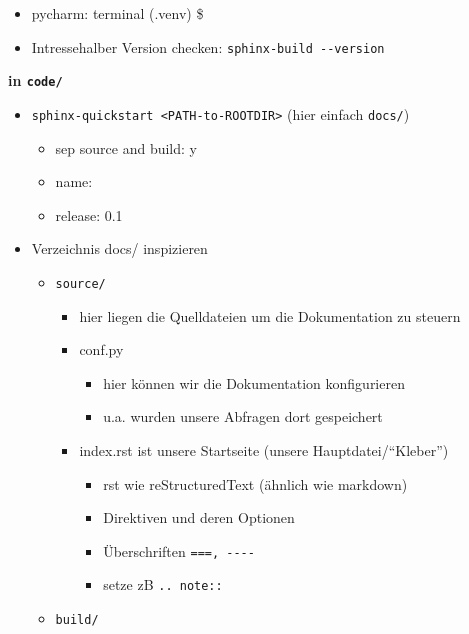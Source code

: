 \begin{itemize}
\item
  pycharm: terminal (.venv) \$
\item
  Intressehalber Version checken: \texttt{sphinx-build\ -\/-version}
\end{itemize}

\textbf{in \texttt{code/}}

\begin{itemize}
\item
  \texttt{sphinx-quickstart\ \textless{}PATH-to-ROOTDIR\textgreater{}}
  (hier einfach \texttt{docs/})

  \begin{itemize}
  \tightlist
  \item
    sep source and build: y
  \item
    name:
  \item
    release: 0.1
  \end{itemize}
\item
  Verzeichnis docs/ inspizieren

  \begin{itemize}
  \tightlist
  \item
    \texttt{source/}

    \begin{itemize}
    \tightlist
    \item
      hier liegen die Quelldateien um die Dokumentation zu steuern
    \item
      conf.py

      \begin{itemize}
      \tightlist
      \item
        hier können wir die Dokumentation konfigurieren
      \item
        u.a. wurden unsere Abfragen dort gespeichert
      \end{itemize}
    \item
      index.rst ist unsere Startseite (unsere Hauptdatei/``Kleber'')

      \begin{itemize}
      \tightlist
      \item
        rst wie reStructuredText (ähnlich wie markdown)
      \item
        Direktiven und deren Optionen
      \item
        Überschriften \texttt{===,\ -\/-\/-\/-}
      \item
        setze zB \texttt{..\ note::}
      \end{itemize}
    \end{itemize}
  \item
    \texttt{build/}


\end{itemize}
\end{itemize}
